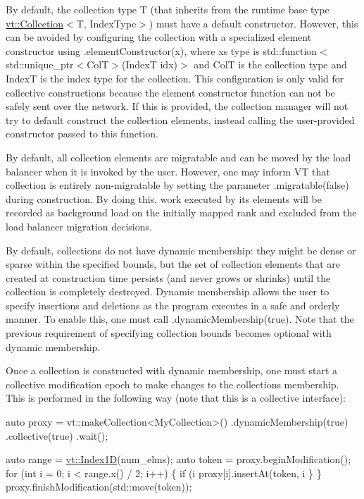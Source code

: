 By default, the collection type {\ttfamily T} (that inherits from the runtime base type {\ttfamily \hyperlink{namespacevt_ac72e048964e4bb536faaa8bc90f58db7}{vt\+::\+Collection}$<$T, Index\+Type$>$}) must have a default constructor. However, this can be avoided by configuring the collection with a specialized element constructor using {\ttfamily .element\+Constructor(x)}, where {\ttfamily x}\textquotesingle{}s type is {\ttfamily std\+::function$<$std\+::unique\+\_\+ptr$<$ColT$>$(IndexT idx)$>$} and {\ttfamily ColT} is the collection type and {\ttfamily IndexT} is the index type for the collection. This configuration is only valid for collective constructions because the element constructor function can not be safely sent over the network. If this is provided, the collection manager will not try to default construct the collection elements, instead calling the user-\/provided constructor passed to this function.

By default, all collection elements are migratable and can be moved by the load balancer when it is invoked by the user. However, one may inform VT that collection is entirely non-\/migratable by setting the parameter {\ttfamily .migratable(false)} during construction. By doing this, work executed by its elements will be recorded as background load on the initially mapped rank and excluded from the load balancer migration decisions.

By default, collections do not have dynamic membership\+: they might be dense or sparse within the specified bounds, but the set of collection elements that are created at construction time persists (and never grows or shrinks) until the collection is completely destroyed. Dynamic membership allows the user to specify insertions and deletions as the program executes in a safe and orderly manner. To enable this, one must call {\ttfamily .dynamic\+Membership(true)}. Note that the previous requirement of specifying collection bounds becomes optional with dynamic membership.

Once a collection is constructed with dynamic membership, one must start a collective modification epoch to make changes to the collection\textquotesingle{}s membership. This is performed in the following way (note that this is a collective interface)\+:


\begin{DoxyCode}
\textcolor{keyword}{auto} proxy = vt::makeCollection<MyCollection>()
  .dynamicMembership(\textcolor{keyword}{true})
  .collective(\textcolor{keyword}{true})
  .wait();

\textcolor{keyword}{auto} range = \hyperlink{namespacevt_a5540efc78234273e1796fb003fe4d234}{vt::Index1D}(num\_elms);
\textcolor{keyword}{auto} token = proxy.beginModification();
\textcolor{keywordflow}{for} (\textcolor{keywordtype}{int} i = 0; i < range.x() / 2; i++) \{
  \textcolor{keywordflow}{if} (i %
      proxy[i].insertAt(token, i %
  \}
\}
proxy.finishModification(std::move(token));
\end{DoxyCode}


